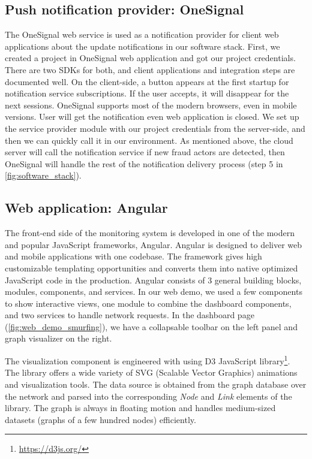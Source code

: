 \subsection{Push notification provider: OneSignal}

The OneSignal web service is used as a notification provider for client web applications about the update notifications in our software stack.
First, we created a project in OneSignal web application and got our project credentials.
There are two SDKs for both, and client applications and integration steps are documented well.
On the client-side, a button appears at the first startup for notification service subscriptions. If the user accepts, it will disappear for the next sessions.
OneSignal supports most of the modern browsers, even in mobile versions.
User will get the notification even web application is closed.
We set up the service provider module with our project credentials from the server-side, and then we can quickly call it in our environment.
As mentioned above, the cloud server will call the notification service if new fraud actors are detected, then OneSignal will handle the rest of the notification delivery process (step 5 in \autoref{fig:software_stack}).

\subsection{Web application: Angular}

The front-end side of the monitoring system is developed in one of the modern and popular JavaScript frameworks, Angular.
Angular is designed to deliver web and mobile applications with one codebase.
The framework gives high customizable templating opportunities and converts them into native optimized JavaScript code in the production.
Angular consists of 3 general building blocks, modules, components, and services.
In our web demo, we used a few components to show interactive views, one module to combine the dashboard components, and two services to handle network requests.
In the dashboard page (\autoref{fig:web_demo_smurfing}), we have a collapsable toolbar on the left panel and graph visualizer on the right.

The visualization component is engineered with using D3 JavaScript library\footnote{\url{https://d3js.org/}}.
The library offers a wide variety of SVG (Scalable Vector Graphics) animations and visualization tools.
The data source is obtained from the graph database over the network and parsed into the corresponding \textit{Node} and \textit{Link} elements of the library.
The graph is always in floating motion and handles medium-sized datasets (graphs of a few hundred nodes) efficiently.

